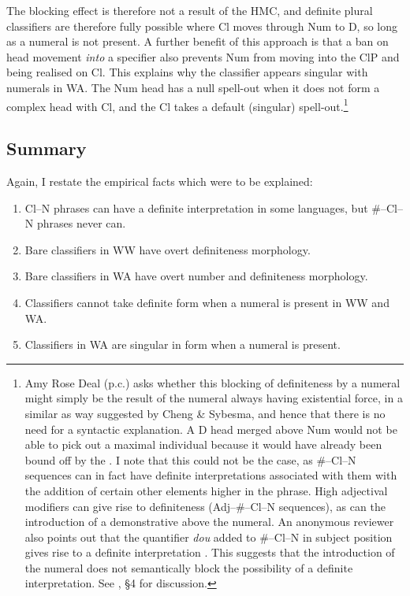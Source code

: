 \documentclass[output=paper
,modfonts
,nonflat]{langsci/langscibook}
\begin{document}
The blocking effect is therefore not a result of the HMC, and definite plural classifiers are therefore fully possible where Cl moves through Num to D, so long as a numeral is not present. A further benefit of this approach is that a ban on head movement \textit{into} a specifier also prevents Num from moving into the ClP and being realised on Cl. This explains why the classifier appears singular with numerals in WA. The Num head has a null spell-out when it does not form a complex head with Cl, and the Cl takes a default (singular) spell-out.\footnote{Amy Rose Deal (p.c.) asks whether this blocking of definiteness by a numeral might simply be the result of the numeral always having existential force, in a similar as way suggested by Cheng \& Sybesma, and hence that there is no need for a syntactic explanation. A D head merged above Num would not be able to pick out a maximal individual because it would have already been bound off by the . I note that this could not be the case, as \#--Cl--N sequences can in fact have definite interpretations associated with them with the addition of certain other elements higher in the phrase. High adjectival modifiers can give rise to definiteness (Adj--\#--Cl--N sequences), as can the introduction of a demonstrative above the numeral. An anonymous reviewer also points out that the quantifier \textit{dou} added to \#--Cl--N in subject position gives rise to a definite interpretation \citep{Cheng2009}. This suggests that the introduction of the numeral does not semantically block the possibility of a definite interpretation. See \citet{Hall2015}, \S 4 for discussion.}

\subsection{Summary}

Again, I restate the empirical facts which were to be explained:

\begin{enumerate}
\item Cl--N phrases can have a definite interpretation in some languages, but \#--Cl--N phrases never can.
\item Bare classifiers in WW have overt definiteness morphology.
\item Bare classifiers in WA have overt number and definiteness morphology.
\item Classifiers cannot take definite form when a numeral is present in WW and WA.
\item Classifiers in WA are singular in form when a numeral is present.
\end{enumerate}
\end{document}
